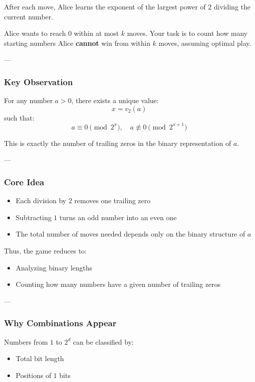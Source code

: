 \documentclass[11pt]{article}
\begin{document}
After each move, Alice learns the exponent of the largest power of $2$
dividing the current number.

Alice wants to reach $0$ within at most $k$ moves.
Your task is to count how many starting numbers Alice \textbf{cannot} win from
within $k$ moves, assuming optimal play.

---

\subsubsection{Key Observation}

For any number $a > 0$, there exists a unique value:
\[
x = v_2(a)
\]
such that:
\[
a \equiv 0 \pmod{2^x}, \quad a \not\equiv 0 \pmod{2^{x+1}}
\]

This is exactly the number of trailing zeros in the binary representation of $a$.

---

\subsubsection{Core Idea}

\begin{itemize}
    \item Each division by $2$ removes one trailing zero
    \item Subtracting $1$ turns an odd number into an even one
    \item The total number of moves needed depends only on the binary structure of $a$
\end{itemize}

Thus, the game reduces to:
\begin{itemize}
    \item Analyzing binary lengths
    \item Counting how many numbers have a given number of trailing zeros
\end{itemize}

---

\subsubsection{Why Combinations Appear}

Numbers from $1$ to $2^d$ can be classified by:
\begin{itemize}
    \item Total bit length
    \item Positions of $1$ bits
\end{itemize}
\end{document}
